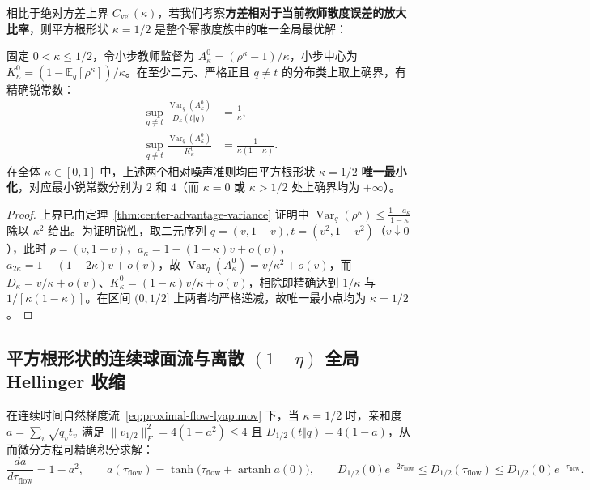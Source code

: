 \documentclass[lang=cn,scheme=chinese,openany]{elegantbook}
\newcommand{\E}{\mathbb E}
\newcommand{\Var}{\operatorname{Var}}
\begin{document}
相比于绝对方差上界 $C_{\mathrm{vel}}(\kappa)$，若我们考察\textbf{方差相对于当前教师散度误差的放大比率}，则平方根形状 $\kappa=1/2$ 是整个幂散度族中的唯一全局最优解：

\begin{theorem}[平方根形状 $\kappa=1/2$ 的相对误差噪声最优性]
\label{thm:power-relative-noise-optimum}
固定 $0<\kappa\le 1/2$，令小步教师监督为 $A_\kappa^0=(\rho^\kappa-1)/\kappa$，小步中心为 $K_\kappa^0=(1-\E_q[\rho^\kappa])/\kappa$。在至少二元、严格正且 $q\ne t$ 的分布类上取上确界，有精确锐常数：
\begin{align}
 \sup_{q\ne t}\frac{\Var_q(A_\kappa^0)}{D_\kappa(t\Vert q)}&=\frac1\kappa,\\
 \sup_{q\ne t}\frac{\Var_q(A_\kappa^0)}{K_\kappa^0}&=\frac1{\kappa(1-\kappa)}.
 \label{eq:power-relative-noise-sharp}
\end{align}
在全体 $\kappa\in[0,1]$ 中，上述两个相对噪声准则均由平方根形状 $\kappa=1/2$ \textbf{唯一最小化}，对应最小锐常数分别为 $2$ 和 $4$（而 $\kappa=0$ 或 $\kappa>1/2$ 处上确界均为 $+\infty$）。
\end{theorem}
\begin{proof}
上界已由定理~\ref{thm:center-advantage-variance} 证明中 $\Var_q(\rho^\kappa)\le\frac{1-a_\kappa}{1-\kappa}$ 除以 $\kappa^2$ 给出。为证明锐性，取二元序列 $q=(v,1-v), t=(v^2,1-v^2)$（$v\downarrow 0$），此时 $\rho=(v,1+v)$，$a_\kappa=1-(1-\kappa)v+o(v)$，$a_{2\kappa}=1-(1-2\kappa)v+o(v)$，故 $\Var_q(A_\kappa^0)=v/\kappa^2+o(v)$，而 $D_\kappa=v/\kappa+o(v)$、$K_\kappa^0=(1-\kappa)v/\kappa+o(v)$，相除即精确达到 $1/\kappa$ 与 $1/[\kappa(1-\kappa)]$。在区间 $(0,1/2]$ 上两者均严格递减，故唯一最小点均为 $\kappa=1/2$。
\end{proof}

\subsection{平方根形状的连续球面流与离散 \texorpdfstring{$(1-\eta)$}{(1-eta)} 全局 Hellinger 收缩}

在连续时间自然梯度流~\eqref{eq:proximal-flow-lyapunov} 下，当 $\kappa=1/2$ 时，亲和度 $a=\sum_v\sqrt{q_v t_v}$ 满足 $\|v_{1/2}\|_F^2=4(1-a^2)\le 4$ 且 $D_{1/2}(t\Vert q)=4(1-a)$，从而微分方程可精确积分求解：
\begin{equation}
 \frac{da}{d\tau_{\mathrm{flow}}}=1-a^2,
 \qquad a(\tau_{\mathrm{flow}})=\tanh\bigl(\tau_{\mathrm{flow}}+\operatorname{artanh}a(0)\bigr),
 \qquad D_{1/2}(0)e^{-2\tau_{\mathrm{flow}}}\le D_{1/2}(\tau_{\mathrm{flow}})\le D_{1/2}(0)e^{-\tau_{\mathrm{flow}}}.
 \label{eq:proximal-hellinger-flow}
\end{equation}
\end{document}
